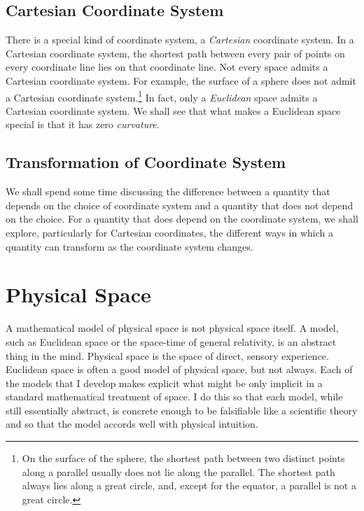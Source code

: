\documentclass[twocolumn,10pt]{book}
\begin{document}
\subsection{Cartesian Coordinate System}

There is a special kind of coordinate system, a \emph{Cartesian} coordinate
system.  In a Cartesian coordinate system, the shortest path between every pair
of points on every coordinate line lies on that coordinate line.  Not every
space admits a Cartesian coordinate system.  For example, the surface of a
sphere does not admit a Cartesian coordinate system.\footnote{%
   On the surface of the sphere, the shortest path between two distinct points
   along a parallel usually does not lie along the parallel.  The shortest path
   always lies along a great circle, and, except for the equator, a parallel is
   not a great circle.%
}
In fact, only a \emph{Euclidean} space admits a Cartesian coordinate system.
We shall see that what makes a Euclidean space special is that it has zero
\emph{curvature}.

\subsection{Transformation of Coordinate System}

We shall spend some time discussing the difference between a quantity that
depends on the choice of coordinate system and a quantity that does not depend
on the choice.  For a quantity that does depend on the coordinate system, we
shall explore, particularly for Cartesian coordinates, the different ways in
which a quantity can transform as the coordinate system changes.

\section{Physical Space}

A mathematical model of physical space is not physical space itself.  A model,
such as Euclidean space or the space-time of general relativity, is an abstract
thing in the mind.  Physical space is the space of direct, sensory experience.
Euclidean space is often a good model of physical space, but not always.  Each
of the models that I develop makes explicit what might be only implicit in a
standard mathematical treatment of space.  I do this so that each model, while
still essentially abstract, is concrete enough to be falsifiable like a
scientific theory and so that the model accords well with physical intuition.
\end{document}
